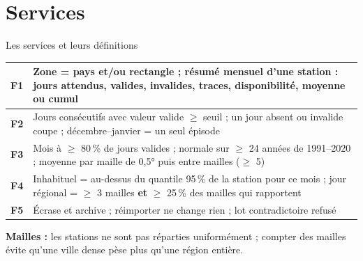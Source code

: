 \documentclass[aspectratio=169]{pres}
\begin{document}
\section{Services}

\begin{frame}{Les services et leurs définitions}
  \small
  \begin{table}
    \centering
    \begin{tabular}{|l|p{11cm}|}
      \hline
      \textbf{F1} & Zone = pays et/ou rectangle ; résumé mensuel d'une station : jours attendus, valides, invalides, traces, disponibilité, moyenne ou cumul \\ \hline
      \textbf{F2} & Jours consécutifs avec valeur valide $\geq$ seuil ; un jour absent ou invalide coupe ; décembre--janvier = un seul épisode \\ \hline
      \textbf{F3} & Mois à $\geq$ 80\,\% de jours valides ; normale sur $\geq$ 24 années de 1991--2020 ; moyenne par maille de 0,5° puis entre mailles ($\geq$ 5) \\ \hline
      \textbf{F4} & Inhabituel = au-dessus du quantile 95\,\% de la station pour ce mois ; jour régional = $\geq$ 3 mailles \textbf{et} $\geq$ 25\,\% des mailles qui rapportent \\ \hline
      \textbf{F5} & Écrase et archive ; réimporter ne change rien ; lot contradictoire refusé \\ \hline
    \end{tabular}
  \end{table}
  \textbf{Mailles :} les stations ne sont pas réparties uniformément ; compter des mailles évite qu'une ville dense pèse plus qu'une région entière.
\end{frame}
\end{document}

